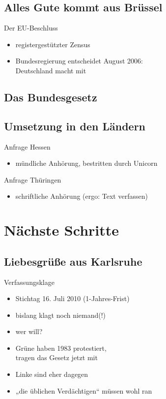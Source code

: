 \documentclass[ignorenonframetext,ucs]{beamer}
\begin{document}
\subsection{Alles Gute kommt aus Brüssel}

\begin{frame}{Der EU-Beschluss}\begin{itemize}
\item registergestützter Zensus
\item Bundesregierung entscheidet August 2006:\\Deutschland macht mit
\end{itemize}\end{frame}

\subsection{Das Bundesgesetz}

\subsection{Umsetzung in den Ländern}

\begin{frame}{Anfrage Hessen}\begin{itemize}
\item mündliche Anhörung, bestritten durch Unicorn
\end{itemize}\end{frame}

\begin{frame}{Anfrage Thüringen}\begin{itemize}
\item schriftliche Anhörung (ergo: Text verfassen)
\end{itemize}\end{frame}

\section{Nächste Schritte}

\subsection{Liebesgrüße aus Karlsruhe}

\begin{frame}{Verfassungsklage}\begin{itemize}
\item Stichtag 16. Juli 2010 (1-Jahres-Frist)
\item bislang klagt noch niemand(!)
\item wer will?
\item Grüne haben 1983 protestiert,\\tragen das Gesetz jetzt mit
\item Linke sind eher dagegen
\item „die üblichen Verdächtigen“ müssen wohl ran
\end{itemize}\end{frame}
\end{document}
